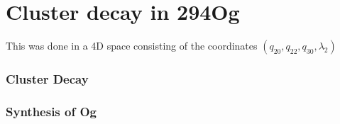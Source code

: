 \chapter{Cluster decay in 294Og}

\maketitle
This was done in a 4D space consisting of the coordinates $(q_{20}, q_{22}, q_{30}, \lambda_2)$

\subsection{Cluster Decay}

\subsection{Synthesis of Og}